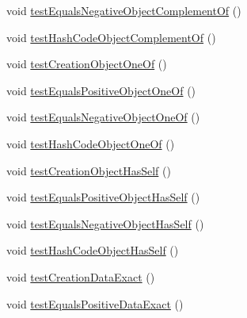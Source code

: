 \begin{DoxyCompactItemize}
\item 
void \hyperlink{classorg_1_1semanticweb_1_1owlapi_1_1datafactory_1_1_o_w_l_data_factory_test_case_a3f771ea19ec397c4691ee8c1aa342da7}{test\-Equals\-Negative\-Object\-Complement\-Of} ()
\item 
void \hyperlink{classorg_1_1semanticweb_1_1owlapi_1_1datafactory_1_1_o_w_l_data_factory_test_case_a80218ec7d385101f9c566e8be8525aaf}{test\-Hash\-Code\-Object\-Complement\-Of} ()
\item 
void \hyperlink{classorg_1_1semanticweb_1_1owlapi_1_1datafactory_1_1_o_w_l_data_factory_test_case_a193a2dfdd22a3b5e25d0bc8b137505e9}{test\-Creation\-Object\-One\-Of} ()
\item 
void \hyperlink{classorg_1_1semanticweb_1_1owlapi_1_1datafactory_1_1_o_w_l_data_factory_test_case_a5bce3af09a6197638f8c5323961edffa}{test\-Equals\-Positive\-Object\-One\-Of} ()
\item 
void \hyperlink{classorg_1_1semanticweb_1_1owlapi_1_1datafactory_1_1_o_w_l_data_factory_test_case_a606562113db51522ce05576a9fc93433}{test\-Equals\-Negative\-Object\-One\-Of} ()
\item 
void \hyperlink{classorg_1_1semanticweb_1_1owlapi_1_1datafactory_1_1_o_w_l_data_factory_test_case_a71bf85727b7cf35d08491609991e2d6d}{test\-Hash\-Code\-Object\-One\-Of} ()
\item 
void \hyperlink{classorg_1_1semanticweb_1_1owlapi_1_1datafactory_1_1_o_w_l_data_factory_test_case_aeeccfff74594cb02b5b816da67707d73}{test\-Creation\-Object\-Has\-Self} ()
\item 
void \hyperlink{classorg_1_1semanticweb_1_1owlapi_1_1datafactory_1_1_o_w_l_data_factory_test_case_ae401cac501c01138d59932f1550c9743}{test\-Equals\-Positive\-Object\-Has\-Self} ()
\item 
void \hyperlink{classorg_1_1semanticweb_1_1owlapi_1_1datafactory_1_1_o_w_l_data_factory_test_case_a80138d211243489276837080947ca7b0}{test\-Equals\-Negative\-Object\-Has\-Self} ()
\item 
void \hyperlink{classorg_1_1semanticweb_1_1owlapi_1_1datafactory_1_1_o_w_l_data_factory_test_case_a9243dcc2aeec7564abaee746fbc1c8a0}{test\-Hash\-Code\-Object\-Has\-Self} ()
\item 
void \hyperlink{classorg_1_1semanticweb_1_1owlapi_1_1datafactory_1_1_o_w_l_data_factory_test_case_a391183417c407625c1630d937d895906}{test\-Creation\-Data\-Exact} ()
\item 
void \hyperlink{classorg_1_1semanticweb_1_1owlapi_1_1datafactory_1_1_o_w_l_data_factory_test_case_adb38bde873566f749a9cd5b85adfce9e}{test\-Equals\-Positive\-Data\-Exact} ()

\end{DoxyCompactItemize}

